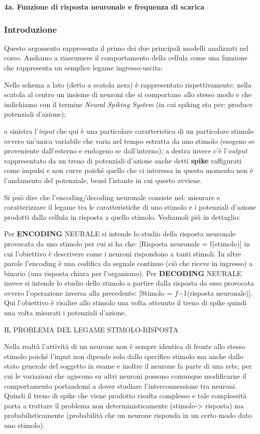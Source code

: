 \documentclass[12pt,a4paper,openany]{book}
\begin{document}
\textbf{4a. Funzione di risposta neuronale e frequenza di scarica}

\subsubsection{Introduzione}

Questo argomento rappresenta il primo dei due principali modelli analizzati nel corso. Andiamo a riassumere il comportamento della cellula come una funzione che rappresenta un semplice legame ingresso-uscita:

Nello schema a lato (detto a scatola nera) è rappresentato rispettivamente: nella scatola al centro un insieme di neuroni che si comportano allo stesso modo e che indichiamo con il termine \textit{Neural Spiking System }(in cui spiking sta per: produce potenziali d'azione);

a sinistra l'\textit{input }che qui è una particolare caratteristica di un particolare stimolo ovvero un'unica variabile che varia nel tempo estratta da uno stimolo (esogeno se proveniente dall'esterno e endogeno se dall'interno); a destra invece c'è l'\textit{output }rappresentato da un treno di potenziali d'azione anche detti \textbf{spike }raffigurati come impulsi e non curve poiché quello che ci interessa in questo momento non è l'andamento del potenziale, bensì l'istante in cui questo avviene.

Si può dire che l'encoding/decoding neuronale consiste nel: misurare e caratterizzare il legame tra le caratteristiche di uno stimolo e i potenziali d'azione prodotti dalla cellula in risposta a quello stimolo. Vediamoli più in dettaglio:

Per \textbf{ENCODING }NEURALE si intende lo studio della risposta neuronale provocata da uno stimolo per cui si ha che: [Risposta neuronale = f(stimolo)] in cui l'obiettivo è descrivere come i neuroni rispondono a tanti stimoli. In altre parole l'encoding è una codifica da segnale continuo (ciò che riceve in ingresso) a binario (una risposta chiara per l'organismo). Per \textbf{DECODING }NEURALE invece si intende lo studio dello stimolo a partire dalla risposta da esso provocata ovvero l'operazione inversa alla precedente: [Stimolo = $f$$-$1(risposta neuronale)]. Qui l'obiettivo è risalire allo stimolo una volta ottenuto il treno di spike quindi una volta misurati i potenziali d'azione.

IL PROBLEMA DEL LEGAME STIMOLO-RISPOSTA

Nella realtà l'attività di un neurone non è sempre identica di fronte allo stesso stimolo poiché l'input non dipende solo dallo specifico stimolo ma anche dallo stato generale del soggetto in esame e inoltre il neurone fa parte di una rete, per cui le variazioni che agiscono su altri neuroni possono comunque modificarne il comportamento portandomi a dover studiare l'interconnessione tra neuroni. Quindi il treno di spike che viene prodotto risulta complesso e tale complessità porta a trattare il problema non deterministicamente (stimolo-> risposta) ma probabilisticamente (probabilità che un neurone risponda in un certo modo dato uno stimolo).
\end{document}
